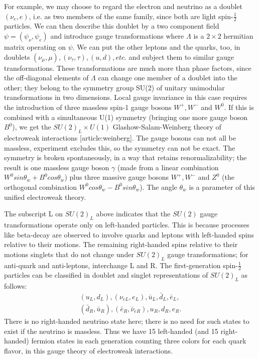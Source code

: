 For example, we may choose to regard the electron and neutrino as a doublet $(\nu_e,e)$, i.e. as two members of the same family, since both are light spin-$\frac{1}{2}$ particles. We can then describe this doublet by a two component field $\psi = (\psi_\nu,\psi_e)$ and introduce gauge transformations where $\Lambda$ is a $2\times 2$ hermitian matrix operating on $\psi$.  We can put the other leptons and the quarks, too, in doublets $(\nu_\mu,\mu),(\nu_\tau,\tau),(u,d),etc.$ and subject them to similar gauge transformations. These transformations are much more than phase factors, since the off-diagonal elements of $\Lambda$ can change one member of a doublet into the other; they belong to the symmetry group SU(2) of unitary unimodular transformations in two dimensions. Local gauge invariance in this case requires the introduction of three massless spin-1 gauge bosons $W^+,W^-$ and $W^0$. If this is combined with a simultaneous U(1) symmetry (bringing one more gauge boson $B^0$), we get the $SU(2)_L\times U(1)$ Glashow-Salam-Weinberg theory of electroweak interactions [article:weinberg]. The gauge bosons can not all be massless, experiment excludes this, so the symmetry can not be exact. The symmetry is broken spontaneously, in a way that retains renormalizability; the result is one massless gauge boson $\gamma$ (made from a linear combination $W^0sin\theta_w +B^0cos\theta_w$) plus three massive gauge bosons $W^+, W^-$ and $Z^0$ (the orthogonal combination $W^0cos\theta_w - B^0sin\theta_w$). The angle $\theta_w$ is a parameter of this unified electroweak theory.

The subscript L on $SU(2)_L$ above indicates that the $SU(2)$ gauge transformations operate only on left-handed particles. This is because processes like beta-decay are observed to involve quarks and leptons with left-handed spins relative to their motions. The remaining right-handed spins relative to their motions singlets that do not change under $SU(2)_L$ gauge transformations; for anti-quark and anti-leptons, interchange L and R. The first-generation spin-$\frac{1}{2}$ particles can be classified in doublet and singlet representations of $SU(2)_L$ as follows:
\begin{eqnarray}
    (u_L,d_L),(\nu_{eL},e_L),\bar{u}_L,\bar{d}_L,\bar{e}_L, \nonumber \\
    (\bar{d}_R,\bar{u}_R),(\bar{e}_R,\bar{\nu}_{eR}),u_R,d_R,e_R.   \nonumber
\end{eqnarray}
There is no right-handed neutrino state here; there is no need for such states to exist if the neutrino is massless. Thus we have 15 left-handed (and 15 right-handed) fermion states in each generation counting three colors for each quark flavor, in this gauge theory of electroweak interactions.

